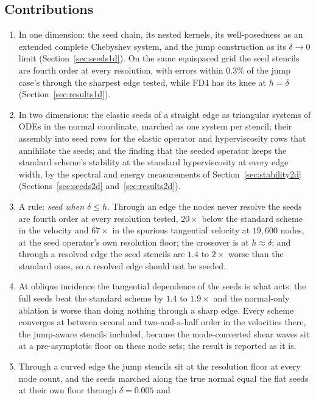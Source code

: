 \documentclass[11pt]{amsart}
\theoremstyle{definition}
\theoremstyle{remark}
\begin{document}
\subsection*{Contributions}
\begin{enumerate}
\item In one dimension: the seed chain, its nested kernels, its
  well-posedness as an extended complete Chebyshev system, and the jump
  construction as its $\delta \to 0$ limit (Section~\ref{sec:seeds1d}).
  On the same equispaced grid the seed stencils are fourth order at every
  resolution, with errors within $0.3\%$ of the jump case's through the
  sharpest edge tested, while FD4 has its knee at $h = \delta$
  (Section~\ref{sec:results1d}).
\item In two dimensions: the elastic seeds of a straight edge as
  triangular systems of ODEs in the normal coordinate, marched as one
  system per stencil; their assembly into seed rows for the elastic
  operator and hyperviscosity rows that annihilate the seeds; and the
  finding that the seeded operator keeps the standard scheme's stability
  at the standard hyperviscosity at every edge width, by the spectral
  and energy measurements of Section~\ref{sec:stability2d}
  (Sections~\ref{sec:seeds2d} and~\ref{sec:results2d}).
\item A rule: \emph{seed when $\delta \le h$}. Through an edge the nodes
  never resolve the seeds are fourth order at every resolution tested,
  $20\times$ below the standard scheme in the velocity and $67\times$ in
  the spurious tangential velocity at $19{,}600$ nodes, at the seed
  operator's own resolution floor; the crossover is at $h \approx
  \delta$; and through a resolved edge the seed stencils are $1.4$ to
  $2\times$ worse than the standard ones, so a resolved edge should not
  be seeded.
\item At oblique incidence the tangential dependence of the seeds is
  what acts: the full seeds beat the standard scheme by $1.4$ to
  $1.9\times$ and the normal-only ablation is worse than doing nothing
  through a sharp edge. Every scheme converges at between second and
  two-and-a-half order in the velocities there, the jump-aware stencils
  included, because the mode-converted shear waves sit at a
  pre-asymptotic floor on these node sets; the result is reported as it
  is.
\item Through a curved edge the jump stencils sit at the resolution
  floor at every node count, and the seeds marched along the true normal
  equal the flat seeds at their own floor through $\delta = 0.005$ and

\end{enumerate}
\end{document}
